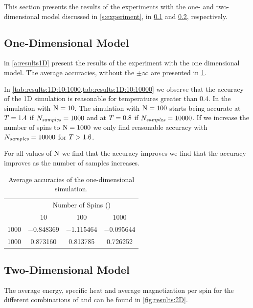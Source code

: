 This section presents the results of the experiments with the one- and two- dimensional model discussed in \cref{s:experiment}, in \cref{ss:results:1D} and \cref{ss:results:2D}, respectively.

\subsection{One-Dimensional Model}
\label{ss:results:1D}
	 in \cref{a:results1D} present the results of the experiment with the one dimensional model. The average accuracies, without the $\pm \infty$ are presented in \cref{tab:results:1D:averageAccuracies}.

	In \cref{tab:results:1D:10:1000,tab:results:1D:10:10000} we observe that the accuracy of the 1D simulation is reasonable for temperatures greater than 0.4. In the simulation with $\mathrm{N} = 10$. 
	The simulation with $\mathrm{N} = 100$ starts being accurate at $T = 1.4$ if $N_\textit{samples} = 1000$ and at $T = 0.8$ if $N_\textit{samples} = 10000$. 
	If we increase the number of spins to $\mathrm{N} = 1000$ we only find reasonable accuracy with $N_\textit{samples} = 10000$ for $T > 1.6$.

	For all values of $\mathrm{N}$ we find that the accuracy improves we find that the accuracy improves as the number of samples increases. 

	\begin{table}
		\centering
		\caption{Average accuracies of the one-dimensional simulation.}
		\begin{tabular}{cccc}
			\toprule
			~ & \multicolumn{3}{c}{Number of Spins (\numberOfSpins)}\\ 
			\cmidrule(r){2-4}
			\numberOfSamples & 10 & 100 & 1000 \\
			 \midrule 
			 1000 & \num{-0.848369} & \num{-1.115464} & \num{-0.095644}\\
			 1000 & \num{0.873160} & \num{0.813785} & \num{0.726252}\\
			\bottomrule
		\end{tabular}
		\label{tab:results:1D:averageAccuracies}			
	\end{table}

\subsection{Two-Dimensional Model}
\label{ss:results:2D}
	The average energy, specific heat and average magnetization per spin for the different combinations of \numberOfSpins and \numberOfSamples can be found in \cref{fig:results:2D}. 

